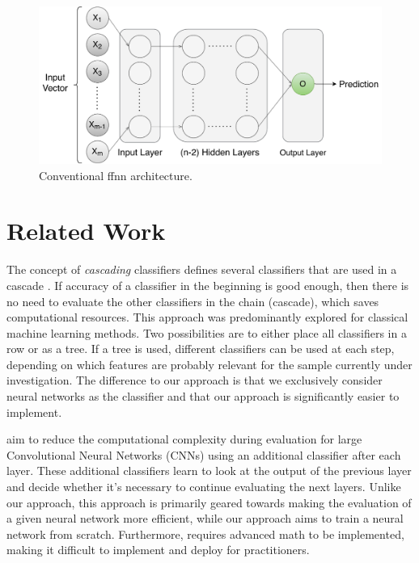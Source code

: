 \documentclass[conference]{IEEEtran}
\begin{document}
 \begin{figure}
  \includegraphics[width=\linewidth]{figures/ffnn_new.pdf}
  \caption{Conventional \gls{ffnn} architecture.}
  \label{fig:ffnn}
\end{figure}

\section{Related Work}

The concept of \textit{cascading} classifiers defines several classifiers that are used in a cascade \cite{viola_robust_2004, xu_classifier_2014, wang_efficient_2015}. If accuracy of a classifier in the beginning is good enough, then there is no need to evaluate the other classifiers in the chain (cascade), which saves computational resources. This approach was predominantly explored for classical machine learning methods. Two possibilities are to either place all classifiers in a row or as a tree. If a tree is used, different classifiers can be used at each step, depending on which features are probably relevant for the sample currently under investigation. The difference to our approach is that we exclusively consider neural networks as the classifier and that our approach is significantly easier to implement.

\cite{bolukbasi_adaptive_2017} aim to reduce the computational complexity during evaluation for large Convolutional Neural Networks (CNNs) using an additional classifier after each layer. These additional classifiers learn to look at the output of the previous layer and decide whether it's necessary to continue evaluating the next layers. Unlike our approach, this approach is primarily geared towards making the evaluation of a given neural network more efficient, while our approach aims to train a neural network from scratch. Furthermore, requires advanced math to be implemented, making it difficult to implement and deploy for practitioners.
\end{document}
